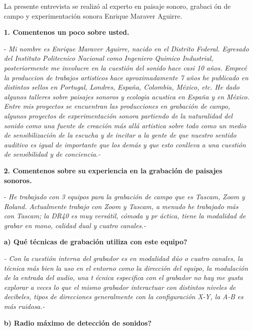 La presente entrevista se realiz\'{o} al experto en paisaje sonoro, grabaci%
\'{o}n de campo y experimentaci\'{o}n sonora Enrique Maraver Aguirre.

\textbf{1. Comentenos un poco sobre usted. }

- \textit{Mi nombre es Enrique Maraver Aguirre, nacido en el Distrito
Federal. Egresado del Instituto Politecnico Nacional como Ingeniero Quimico
Industrial, posteriormente me involucre en la cuesti\'{o}n del sonido hace
casi 10 a\~{n}os. Empec\'{e} la produccion de trabajos artisticos hace
aproximadamente 7 a\~{n}os he publicado en distintos sellos en Portugal,
Londres, Espa\~{n}a, Colombia, M\'{e}xico, etc. He dado algunos talleres
sobre paisajes sonoros y ecologia acustica en Espa\~{n}a y en M\'{e}xico.
Entre mis proyectos se encuentran las producciones en grabaci\'{o}n de
campo, algunos proyectos de experimentaci\'{o}n sonora partiendo de la
naturalidad del sonido como una fuente de creaci\'{o}n m\'{a}s all\'{a}
artistica sobre todo como un medio de sensibilizaci\'{o}n de la escucha y de
incitar a la gente de que nuestro sentido auditivo es igual de importante
que los dem\'{a}s y que esto conlleva a una cuesti\'{o}n de sensibilidad y
de conciencia.-}

\textbf{2. Comentenos sobre su experiencia en la grabaci\'{o}n de paisajes
sonoros.}

- \textit{He trabajado con 3 equipos para la grabaci\'{o}n de campo que es
Tascam, Zoom y Roland. Actualmente trabajo con Zoom y Tascam, a menudo he
trabajado m\'{a}s con Tascam; la DR40 es muy vers\'{a}til, c\'{o}moda y pr%
\'{a}ctica, tiene la modalidad de grabar en mono, calidad dual y cuatro
canales.-}

\textbf{a) \textquestiondown Qu\'{e} t\'{e}cnicas de grabaci\'{o}n utiliza
con este equipo? }

\textit{- Con la cuesti\'{o}n interna del grabador es en modalidad d\'{u}o o
cuatro canales, la t\'{e}cnica m\'{a}s bien la uso en el entorno como la
direcci\'{o}n del equipo, la modulaci\'{o}n de la entrada del audio, una t%
\'{e}cnica especifica con el grabador no hay me gusta explorar a veces lo
que el mismo grabador interactuar con distintos niveles de decibeles, tipos
de direcciones generalmente con la configuraci\'{o}n X-Y, la A-B es m\'{a}s
ruidosa.-}

\textbf{b) \textquestiondown Radio m\'{a}ximo de detecci\'{o}n de sonidos?}

